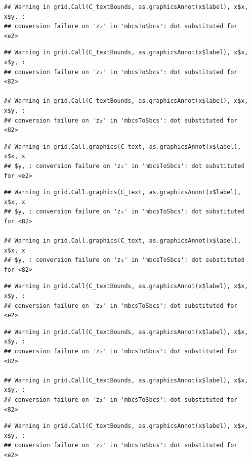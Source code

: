 \documentclass[]{article}
\begin{document}
\begin{verbatim}
## Warning in grid.Call(C_textBounds, as.graphicsAnnot(x$label), x$x, x$y, :
## conversion failure on 'z₂' in 'mbcsToSbcs': dot substituted for <e2>
\end{verbatim}

\begin{verbatim}
## Warning in grid.Call(C_textBounds, as.graphicsAnnot(x$label), x$x, x$y, :
## conversion failure on 'z₂' in 'mbcsToSbcs': dot substituted for <82>

## Warning in grid.Call(C_textBounds, as.graphicsAnnot(x$label), x$x, x$y, :
## conversion failure on 'z₂' in 'mbcsToSbcs': dot substituted for <82>
\end{verbatim}

\begin{verbatim}
## Warning in grid.Call.graphics(C_text, as.graphicsAnnot(x$label), x$x, x
## $y, : conversion failure on 'z₂' in 'mbcsToSbcs': dot substituted for <e2>
\end{verbatim}

\begin{verbatim}
## Warning in grid.Call.graphics(C_text, as.graphicsAnnot(x$label), x$x, x
## $y, : conversion failure on 'z₂' in 'mbcsToSbcs': dot substituted for <82>

## Warning in grid.Call.graphics(C_text, as.graphicsAnnot(x$label), x$x, x
## $y, : conversion failure on 'z₂' in 'mbcsToSbcs': dot substituted for <82>
\end{verbatim}

\begin{verbatim}
## Warning in grid.Call(C_textBounds, as.graphicsAnnot(x$label), x$x, x$y, :
## conversion failure on 'z₂' in 'mbcsToSbcs': dot substituted for <e2>
\end{verbatim}

\begin{verbatim}
## Warning in grid.Call(C_textBounds, as.graphicsAnnot(x$label), x$x, x$y, :
## conversion failure on 'z₂' in 'mbcsToSbcs': dot substituted for <82>

## Warning in grid.Call(C_textBounds, as.graphicsAnnot(x$label), x$x, x$y, :
## conversion failure on 'z₂' in 'mbcsToSbcs': dot substituted for <82>
\end{verbatim}

\begin{verbatim}
## Warning in grid.Call(C_textBounds, as.graphicsAnnot(x$label), x$x, x$y, :
## conversion failure on 'z₂' in 'mbcsToSbcs': dot substituted for <e2>
\end{verbatim}
\end{document}
